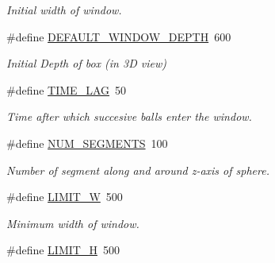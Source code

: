 \begin{DoxyCompactItemize}
\begin{DoxyCompactList}\small\item\em Initial width of window. \end{DoxyCompactList}\item 
\hypertarget{group___d_e_f_i_n_e_ga624e1e19728aaa9abcfb678c6025e38f}{\#define \hyperlink{group___d_e_f_i_n_e_ga624e1e19728aaa9abcfb678c6025e38f}{D\-E\-F\-A\-U\-L\-T\-\_\-\-W\-I\-N\-D\-O\-W\-\_\-\-D\-E\-P\-T\-H}~600}\label{group___d_e_f_i_n_e_ga624e1e19728aaa9abcfb678c6025e38f}

\begin{DoxyCompactList}\small\item\em Initial Depth of box (in 3\-D view) \end{DoxyCompactList}\item 
\hypertarget{group___d_e_f_i_n_e_gae18610b134c10d11e590b789ca741d61}{\#define \hyperlink{group___d_e_f_i_n_e_gae18610b134c10d11e590b789ca741d61}{T\-I\-M\-E\-\_\-\-L\-A\-G}~50}\label{group___d_e_f_i_n_e_gae18610b134c10d11e590b789ca741d61}

\begin{DoxyCompactList}\small\item\em Time after which succesive balls enter the window. \end{DoxyCompactList}\item 
\hypertarget{group___d_e_f_i_n_e_gaddd7cbe43c46d853f4128514b916b393}{\#define \hyperlink{group___d_e_f_i_n_e_gaddd7cbe43c46d853f4128514b916b393}{N\-U\-M\-\_\-\-S\-E\-G\-M\-E\-N\-T\-S}~100}\label{group___d_e_f_i_n_e_gaddd7cbe43c46d853f4128514b916b393}

\begin{DoxyCompactList}\small\item\em Number of segment along and around z-\/axis of sphere. \end{DoxyCompactList}\item 
\hypertarget{group___d_e_f_i_n_e_ga75e5e541dc25d8b29e327598825ea914}{\#define \hyperlink{group___d_e_f_i_n_e_ga75e5e541dc25d8b29e327598825ea914}{L\-I\-M\-I\-T\-\_\-\-W}~500}\label{group___d_e_f_i_n_e_ga75e5e541dc25d8b29e327598825ea914}

\begin{DoxyCompactList}\small\item\em Minimum width of window. \end{DoxyCompactList}\item 
\hypertarget{group___d_e_f_i_n_e_ga69e965de5fac4f8e733454dc17872c35}{\#define \hyperlink{group___d_e_f_i_n_e_ga69e965de5fac4f8e733454dc17872c35}{L\-I\-M\-I\-T\-\_\-\-H}~500}\label{group___d_e_f_i_n_e_ga69e965de5fac4f8e733454dc17872c35}


\end{DoxyCompactItemize}
